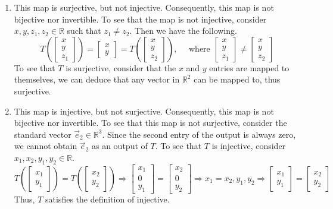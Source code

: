 \begin{SaveQuestion}
\begin{enumerate}
        \item This map is surjective, but not injective. Consequently, this map is not bijective nor invertible. To see that the map is not injective, consider $x,y,z_1, z_2 \in \mathbb{R}$ such that $z_1 \neq z_2$. Then we have the following.
        $$T\left(\begin{bmatrix} x \\ y \\ z_1 \end{bmatrix}\right) = \begin{bmatrix} x \\ y \end{bmatrix} = T\left(\begin{bmatrix} x \\ y \\ z_2 \end{bmatrix}\right), \quad \text{ where } \begin{bmatrix} x \\ y \\ z_1 \end{bmatrix} \neq \begin{bmatrix} x \\ y \\ z_2 \end{bmatrix}$$
        To see that $T$ is surjective, consider that the $x$ and $y$ entries are mapped to themselves, we can deduce that any vector in $\mathbb{R}^2$ can be mapped to, thus surjective. 
        
        \item This map is injective, but not surjective. Consequently, this map is not bijective nor invertible. To see that this map is not surjective, consider the standard vector $\vec e_2 \in \mathbb{R}^3$. Since the second entry of the output is always zero, we cannot obtain $\vec e_2$ as an output of $T$. To see that $T$ is injective, consider $x_1, x_2, y_1, y_2 \in \mathbb{R}$.
        $$T\left(\begin{bmatrix} x_1 \\ y_1 \end{bmatrix}\right) = T\left(\begin{bmatrix} x_2 \\ y_2 \end{bmatrix}\right) \Longrightarrow \begin{bmatrix} x_1 \\ 0 \\ y_1 \end{bmatrix} = \begin{bmatrix} x_2 \\ 0 \\ y_2 \end{bmatrix} \Longrightarrow x_1 = x_2, y_1, y_2 \Longrightarrow \begin{bmatrix} x_1 \\ y_1 \end{bmatrix} = \begin{bmatrix} x_2 \\ y_2 \end{bmatrix}$$
        Thus, $T$ satisfies the definition of injective. 


\end{enumerate}
\end{SaveQuestion}
